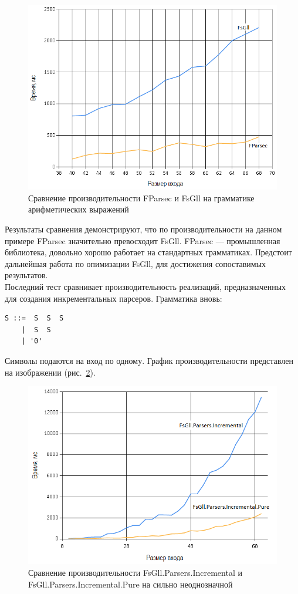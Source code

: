 \documentclass[14pt]{matmex-diploma}
\begin{document}
\begin{figure}[!h]
  \label{ec_fparsec_fsgll_1}
  \centering
  \includegraphics[width=15cm]{pics/graph2.png}
  \caption{Сравнение производительности FParsec и FsGll на грамматике арифметических выражений}
\end{figure}
\FloatBarrier

Результаты сравнения демонстрируют, что по производительности на данном примере FParsec значительно превосходит FsGll. FParsec --- промышленная библиотека, довольно хорошо работает на стандартных грамматиках. Предстоит дальнейшая работа по опимизации FsGll, для достижения сопоставимых результатов.
\\
Последний тест сравнивает производительность реализаций, предназначенных для создания 
инкрементальных парсеров. Грамматика вновь:
\begin{lstlisting}
S ::=  S  S  S 
    |  S  S 
    | '0'
\end{lstlisting}
Символы подаются на вход по одному. 
График производительности представлен на изображении (рис.~\ref{nnn_fsgll_incr}). \\

	
\begin{figure}[!h]
  \label{nnn_fsgll_incr}
  \centering
  \includegraphics[width=15cm]{pics/graph3.png}
  \caption{Сравнение производительности FsGll.Parsers.Incremental и FsGll.Parsers.Incremental.Pure на сильно неоднозначной}
\end{figure}
\FloatBarrier
\end{document}

